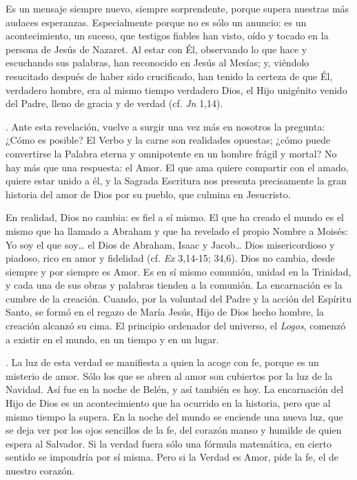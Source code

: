 \begin{body}
\begin{body}
Es un mensaje siempre nuevo, siempre sorprendente, porque supera nuestras más audaces esperanzas. Especialmente porque no es sólo un anuncio: es un acontecimiento, un suceso, que testigos fiables han visto, oído y tocado en la persona de Jesús de Nazaret. Al estar con Él, observando lo que hace y escuchando sus palabras, han reconocido en Jesús al Mesías; y, viéndolo resucitado después de haber sido crucificado, han tenido la certeza de que Él, verdadero hombre, era al mismo tiempo verdadero Dios, el Hijo unigénito venido del Padre, lleno de gracia y de verdad (cf. \emph{Jn} 1,14).

. Ante esta revelación, vuelve a surgir una vez más en nosotros la pregunta: ¿Cómo es posible? El Verbo y la carne son realidades opuestas; ¿cómo puede convertirse la Palabra eterna y omnipotente en un hombre frágil y mortal? No hay más que una respuesta: el Amor. El que ama quiere compartir con el amado, quiere estar unido a él, y la Sagrada Escritura nos presenta precisamente la gran historia del amor de Dios por su pueblo, que culmina en Jesucristo.

En realidad, Dios no cambia: es fiel a sí mismo. El que ha creado el mundo es el mismo que ha llamado a Abraham y que ha revelado el propio Nombre a Moisés: Yo soy el que soy\ldots{} el Dios de Abraham, Isaac y Jacob\ldots{} Dios misericordioso y piadoso, rico en amor y fidelidad (cf. \emph{Ex} 3,14-15; 34,6). Dios no cambia, desde siempre y por siempre es Amor. Es en sí mismo comunión, unidad en la Trinidad, y cada una de sus obras y palabras tienden a la comunión. La encarnación es la cumbre de la creación. Cuando, por la voluntad del Padre y la acción del Espíritu Santo, se formó en el regazo de María Jesús, Hijo de Dios hecho hombre, la creación alcanzó su cima. El principio ordenador del universo, el \emph{Logos}, comenzó a existir en el mundo, en un tiempo y en un lugar.

. La luz de esta verdad se manifiesta a quien la acoge con fe, porque es un misterio de amor. Sólo los que se abren al amor son cubiertos por la luz de la Navidad. Así fue en la noche de Belén, y así también es hoy. La encarnación del Hijo de Dios es un acontecimiento que ha ocurrido en la historia, pero que al mismo tiempo la supera. En la noche del mundo se enciende una nueva luz, que se deja ver por los ojos sencillos de la fe, del corazón manso y humilde de quien espera al Salvador. Si la verdad fuera sólo una fórmula matemática, en cierto sentido se impondría por sí misma. Pero si la Verdad es Amor, pide la fe, el  de nuestro corazón.


\end{body}
\end{body}
